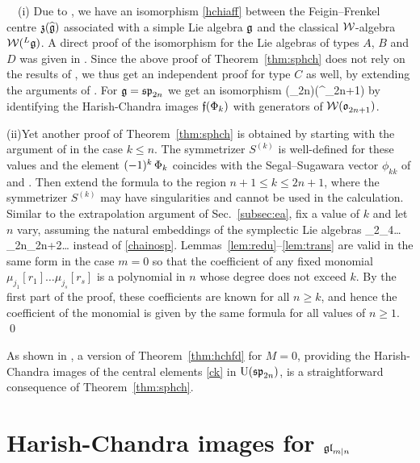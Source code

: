 \documentclass[12pt]{article}
\begin{document}
\bre\label{rem:typec}\ \ (i)\quad
Due to \cite[Theorem~8.1.5]{f:lc}, we have an isomorphism \eqref{hchiaff}
between the Feigin--Frenkel centre $\mathfrak{z}(\widehat{\mathfrak{g}})$ associated with a simple Lie algebra $\mathfrak{g}$
and the classical ${\mathcal W}$-algebra ${\mathcal W}({}^L\mathfrak{g})$.
A direct proof of the isomorphism for the Lie algebras of types $A$, $B$ and $D$ was given in
\cite[Sec.~13.1]{m:so}.
Since the above proof of Theorem~\ref{thm:sphch} does not rely
on the results of \cite{f:lc}, we thus get an independent proof
for type $C$ as well, by
extending
the arguments of \cite[Sec.~13.1]{m:so}. For $\mathfrak{g}=\mathfrak{sp}_{2n}$ we
get an isomorphism
\ben
\z(\wh\spa_{2n})\cong \Wc(\oa^{}_{2n+1})
\een
by identifying the Harish-Chandra images $\mathfrak{f}(\Phi_k)$ with generators of
${\mathcal W}(\mathfrak{o}^{}_{2n+1})$.
\par
(ii)\quad Yet another proof of Theorem~\ref{thm:sphch}
is obtained by starting with
the argument of \cite[Prop.~13.1.14]{m:so}
in the case $k\leqslant n$. The symmetrizer
$S^{(k)}$ is well-defined for these values and the element $(-1)^k\, \Phi_k$
coincides with the Segal--Sugawara vector $\phi_{kk}$ of \cite{m:ss}
and \cite[Sec.~8.3]{m:so}. Then extend the formula to the region $n+1\leqslant k\leqslant 2n+1$, where
the symmetrizer $S^{(k)}$ may have singularities and cannot be used in the calculation.
Similar to the extrapolation argument of
Sec.~\ref{subsec:ea}, fix a value of $k$ and let $n$ vary, assuming the natural
embeddings of the symplectic Lie algebras
\spa_{2}\subset \spa_{4}\subset \dots\subset \spa_{2n}\subset \spa_{2n+2}\subset\dots
\eeq
instead of \eqref{chainosp}.
Lemmas~\ref{lem:redu}--\ref{lem:trans}
are valid in the same form in the case $m=0$ so that
the coefficient of any fixed monomial $\mu_{j_1}[r_1]\dots \mu_{j_s}[r_s]$
is a polynomial in $n$ whose degree does not exceed $k$. By the
first part of the proof,
these coefficients are known for all $n\geqslant k$, and hence the
coefficient of the monomial is given by the same formula for all values of $n\geqslant 1$.
\qed
\ere

As shown in \cite[Cor.~13.4.6]{m:so}, a version
of Theorem~\ref{thm:hchfd} for $M=0$,
providing the Harish-Chandra images of the central elements \eqref{ck} in ${\rm U}(\mathfrak{sp}_{2n})$,
is a straightforward consequence of Theorem~\ref{thm:sphch}.



\appendix


\section{Harish-Chandra images for $\mathfrak{gl}_{m|n}$}
\label{sec:gl}
\end{document}
